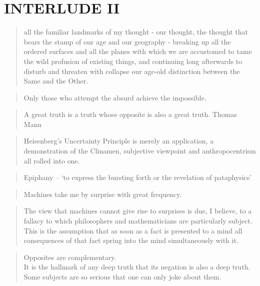 
\pagestyle{empty}

\chapter*{INTERLUDE II}
\label{interlude2}



\begin{quotation}
  all the familiar landmarks of my thought - our thought, the thought that bears the stamp of our age and our geography - breaking up all the ordered surfaces and all the planes with which we are accustomed to tame the wild profusion of existing things, and continuing long afterwards to disturb and threaten with collapse our age-old distinction between the Same and the Other. 
\end{quotation}

\begin{quotation}
    Only those who attempt the absurd achieve the impossible. 
\end{quotation}

\begin{quotation}
    A great truth is a truth whose opposite is also a great truth. Thomas Mann 
\end{quotation}

\begin{quotation}
    Heisenberg's Uncertainty Principle is merely an application, a demonstration of the Clinamen, subjective viewpoint and anthropocentrism all rolled into one. 
\end{quotation}

\begin{quotation}
    Epiphany – `to express the bursting forth or the revelation of pataphysics' 
\end{quotation}

\begin{quotation}
    Machines take me by surprise with great frequency.
\end{quotation}

\begin{quotation}
    The view that machines cannot give rise to surprises is due, I believe, to a fallacy to which philosophers and mathematicians are particularly subject. This is the assumption that as soon as a fact is presented to a mind all consequences of that fact spring into the mind simultaneously with it.
\end{quotation}

\begin{quotation}
  Opposites are complementary.\\
  It is the hallmark of any deep truth that its negation is also a deep truth.\\
  Some subjects are so serious that one can only joke about them.
\end{quotation}

\clearpage